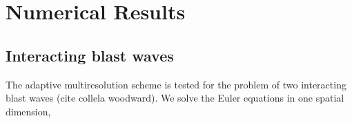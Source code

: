 \documentclass[]{article}
\begin{document}
%
%        
%        
%
%
%        
%
%

\section{Numerical Results}

    \subsection*{Interacting blast waves}

        The adaptive multiresolution scheme is tested for the problem of two
        interacting blast waves (cite collela woodward).  We solve the Euler
        equations in one spatial dimension,
\end{document}
